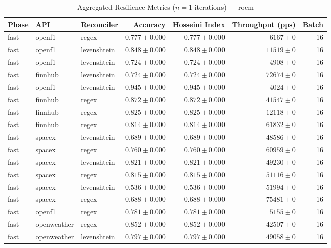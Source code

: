
\begin{table}[htbp]
\caption{Aggregated Resilience Metrics ($n=1$ iterations) --- rocm}
\begin{tabular}{l l l r r r r}
\hline
Phase & API & Reconciler & Accuracy & Hosseini Index & Throughput (pps) & Batch \\
\hline
fast & openf1 & regex & $0.777\pm0.000$ & $0.777\pm0.000$ & $6167\pm0$ & 16 \\
fast & openf1 & levenshtein & $0.848\pm0.000$ & $0.848\pm0.000$ & $11519\pm0$ & 16 \\
fast & openf1 & levenshtein & $0.724\pm0.000$ & $0.724\pm0.000$ & $4908\pm0$ & 16 \\
fast & finnhub & levenshtein & $0.724\pm0.000$ & $0.724\pm0.000$ & $72674\pm0$ & 16 \\
fast & openf1 & levenshtein & $0.945\pm0.000$ & $0.945\pm0.000$ & $4024\pm0$ & 16 \\
fast & finnhub & regex & $0.872\pm0.000$ & $0.872\pm0.000$ & $41547\pm0$ & 16 \\
fast & finnhub & regex & $0.825\pm0.000$ & $0.825\pm0.000$ & $12118\pm0$ & 16 \\
fast & finnhub & regex & $0.814\pm0.000$ & $0.814\pm0.000$ & $61832\pm0$ & 16 \\
fast & spacex & levenshtein & $0.689\pm0.000$ & $0.689\pm0.000$ & $48586\pm0$ & 16 \\
fast & spacex & regex & $0.760\pm0.000$ & $0.760\pm0.000$ & $60959\pm0$ & 16 \\
fast & spacex & levenshtein & $0.821\pm0.000$ & $0.821\pm0.000$ & $49230\pm0$ & 16 \\
fast & spacex & regex & $0.815\pm0.000$ & $0.815\pm0.000$ & $51116\pm0$ & 16 \\
fast & spacex & levenshtein & $0.536\pm0.000$ & $0.536\pm0.000$ & $51994\pm0$ & 16 \\
fast & spacex & regex & $0.688\pm0.000$ & $0.688\pm0.000$ & $75481\pm0$ & 16 \\
fast & openf1 & regex & $0.781\pm0.000$ & $0.781\pm0.000$ & $5155\pm0$ & 16 \\
fast & openweather & regex & $0.852\pm0.000$ & $0.852\pm0.000$ & $42507\pm0$ & 16 \\
fast & openweather & levenshtein & $0.797\pm0.000$ & $0.797\pm0.000$ & $49058\pm0$ & 16 \\

\end{tabular}
\end{table}
